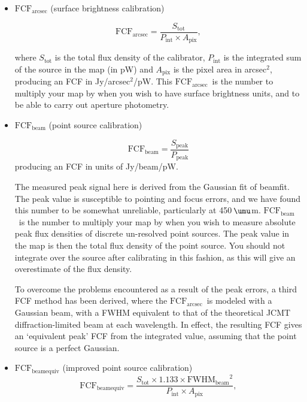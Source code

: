 \documentclass[twoside,11pt]{article}
\newcommand{\micron}{\mbox{\,${\umu}$m}}            %
\newcommand{\xref}[3]{#1}
\renewcommand{\_}{\texttt{\symbol{95}}}
\newcommand{\fcfbe}{$\mathrm{FCF_{beamequiv}}$}
\newcommand{\fcfb}{$\mathrm{FCF_{beam}}$}
\newcommand{\fcfa}{$\mathrm{FCF_{arcsec}}$}
\newcommand{\task}[1]{\textsf{#1}}
\newcommand{\beamfit}{\xref{\task{beamfit}}{sun95}{BEAMFIT}}
\begin{document}
\begin{itemize}

\item{\textbf{\fcfa} (surface brightness calibration)}

\begin{equation}
\label{eq:fcf_arcsec}
\mathrm{FCF_{arcsec}} = \frac{S_\mathrm{tot}}{P_\mathrm{int} \times
  A_\mathrm{pix}},
\end{equation}

where $S_\mathrm{tot}$ is the total flux density of the calibrator,
$P_\mathrm{int}$ is the integrated sum of the source in the map (in
pW) and $A_\mathrm{pix}$ is the pixel area in arcsec$^2$, producing an
FCF in Jy/arcsec$^2$/pW. This \fcfa\ is the number to
multiply your map by when you wish to have surface brightness units,
and to be able to carry out aperture photometry.

\item{\textbf{\fcfb} (point source calibration)}

\begin{equation}
\label{eq:fcf_beam}
\mathrm{FCF_{beam}} = \frac{S_\mathrm{{peak}}}{P_\mathrm{peak}}
\end{equation}
producing an FCF in units of Jy/beam/pW.

The measured peak signal here is derived from the Gaussian fit of
\beamfit. The peak value is susceptible to pointing and focus errors,
and we have found this number to be somewhat unreliable, particularly
at 450\micron. \fcfb\ is the number to multiply your
map by when you wish to measure absolute peak flux densities of
discrete un-resolved point sources. The peak value in the map is then
the total flux density of the point source. You should not integrate
over the source after calibrating in this fashion, as this will give
an overestimate of the flux density.

To overcome the problems encountered as a result of the peak errors, a
third FCF method has been derived, where the \fcfa\
is modeled with a Gaussian beam, with a FWHM equivalent to that of the
theoretical JCMT diffraction-limited beam at each wavelength. In
effect, the resulting FCF gives an `equivalent peak' FCF from the
integrated value, assuming that the point source is a perfect
Gaussian.

\item{\textbf{\fcfbe} (improved point source calibration)}
\begin{equation}
\label{eq:fcf_beamequiv}
\mathrm{FCF_{beamequiv}} = \frac{S_\mathrm{tot} \times 1.133 \times
  {\mathrm{FWHM_{beam}}}^2}{P_\mathrm{int} \times A_\mathrm{pix}},
\end{equation}


\end{itemize}
\end{document}
